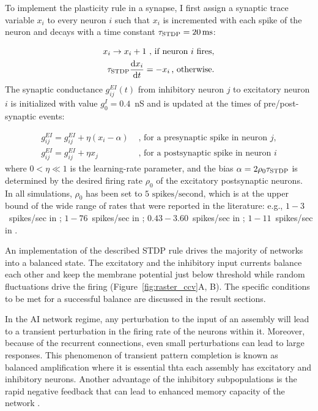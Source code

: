     To implement the plasticity rule in a synapse, I first assign a synaptic trace variable $x_i$ to every neuron $i$ such that $x_i$ is incremented with each spike of the neuron and decays with a time constant $\tau_{\rm STDP}=20\,{\rm ms}$:

    \begin{align*}
      x_i \rightarrow x_i+1 {\text{ , if neuron $i$ fires}}\text{,} \\
      \tau_{\rm STDP}\frac{{\rm d}x_i }{{\rm d}t}=-x_i \, {\text{, otherwise}}.
    \end{align*}
    The synaptic conductance $g_{ij}^{EI}(t)$ from inhibitory neuron $j$ to excitatory neuron $i$ is initialized with value $g_0^I=0.4$~nS and is updated at the times of pre/post-synaptic events:

    \begin{align*}
      g_{ij}^{EI} = g_{ij}^{EI} + \eta(x_i-\alpha) &{\text{    , for a presynaptic spike in neuron $j$,}}\\
      g_{ij}^{EI} = g_{ij}^{EI} + \eta x_j  &{\text{    , for a postsynaptic spike in neuron $i$}}
    \end{align*}
    where $0< \eta \ll 1$ is the learning-rate parameter, and the bias $\alpha=2\rho_0\tau_{\rm STDP}$ is determined by the desired firing rate $\rho_0$ of the excitatory postsynaptic neurons.
    In all simulations, $\rho_0$ has been set to $5 {\text{ spikes/second}}$, which is at the upper bound of the wide range of rates that were reported in the literature: e.g., $1-3$~spikes/sec in \cite{Csicsvari2000}; $1-76$~spikes/sec in \cite{Felsen2005}; $0.43-3.60$~spikes/sec in \cite{Cheng2013}; $1-11$~spikes/sec in \cite{English2014}.
    
    An implementation of the described STDP rule drives the majority of networks into a balanced state.
    The excitatory and the inhibitory input currents balance each other and keep the membrane potential just below threshold while random fluctuations drive the firing (Figure~\ref{fig:raster_ccv}A, B).
    The specific conditions to be met for a successful balance are discussed in the result sections.

    In the AI network regime, any perturbation to the input of an assembly will lead to a transient perturbation in the firing rate of the neurons within it.
    Moreover, because of the recurrent connections, even small perturbations can lead to large responses.
    This phenomenon of transient pattern completion is known as balanced amplification \citep{Murphy2009} where it is essential thta each assembly has excitatory and inhibitory neurons.
    Another advantage of the inhibitory subpopulations is the rapid negative feedback that can lead to enhanced memory capacity of the network \citep{Kammerer2013}.

